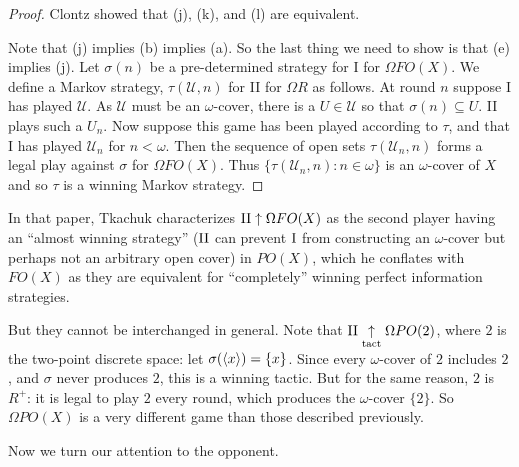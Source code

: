 \documentclass[11pt]{article}
\theoremstyle{plain}
\theoremstyle{definition}
\theoremstyle{remark}
\theoremstyle{plain}
\theoremstyle{definition}
\theoremstyle{remark}
\begin{document}
\begin{proof}
Clontz showed that (j), (k), and (l) are equivalent.

Note that (j) implies (b) implies (a).
So the last thing we need to show is that (e) implies (j).
Let \(\sigma(n)\) be a pre-determined strategy for I for \(\Omega FO(X)\).
We define a Markov strategy, \(\tau(\mathcal{U},n)\) for II for \(\Omega R\) as follows.
At round \(n\) suppose I has played \(\mathcal{U}\).
As \(\mathcal{U}\) must be an \(\omega\)-cover, there is a \(U \in \mathcal{U}\) so that \(\sigma(n) \subseteq U\).
II plays such a \(U_n\).
Now suppose this game has been played according to \(\tau\), and that I has played \(\mathcal{U}_n\) for \(n < \omega\).
Then the sequence of open sets \(\tau(\mathcal{U}_n,n)\) forms a legal play against \(\sigma\) for \(\Omega FO(X)\).
Thus \(\{\tau(\mathcal{U}_n,n) : n \in \omega\}\) is an \(\omega\)-cover of \(X\) and so \(\tau\) is a winning Markov strategy.
\end{proof}

In that paper, Tkachuk characterizes \(\mathrm{II}\uparrow\Omega FO(X)\)
as the second player having an ``almost winning strategy''
(\(\mathrm{II}\) can prevent \(\mathrm{I}\) from constructing an \(\omega\)-cover
but perhaps not an arbitrary open cover)
in \(PO(X)\), which he conflates with \(FO(X)\) as they are
equivalent for ``completely'' winning perfect information strategies. 

But they cannot be interchanged in general.
Note that \(\mathrm{II}\underset{\text{tact}}{\uparrow}\Omega PO(2)\), where \(2\) is the two-point discrete space:
let \(\sigma(\langle x\rangle)=\{x\}\). Since every \(\omega\)-cover of \(2\) includes \(2\),
and \(\sigma\) never produces \(2\), this is a winning tactic. But for the same
reason, \(2\) is \(R^+\): it is legal to play \(2\) every round,
which produces the \(\omega\)-cover \(\{2\}\).
So \(\Omega PO(X)\) is a very different game than those described previously.


Now we turn our attention to the opponent.
\end{document}
